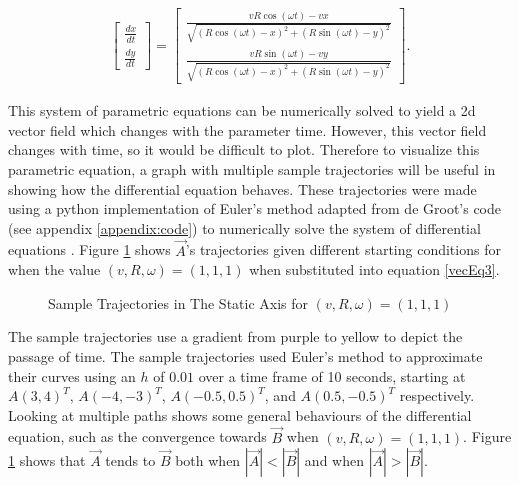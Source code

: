 \documentclass[pstricks, border=12pt]{article}
\begin{document}
\begin{equation}
    \begin{split}
    \begin{bmatrix}
        \frac{dx}{dt}\\
        \frac{dy}{dt}
    \end{bmatrix}
    = 
    \begin{bmatrix}
        \frac{vR\cos(\omega t) - vx}{\sqrt{(R\cos(\omega t) - x)^2 + (R\sin(\omega t) - y)^2}}\\
        \frac{vR\sin(\omega t) - vy}{\sqrt{(R\cos(\omega t) - x)^2 + (R\sin(\omega t) - y)^2}}
    \end{bmatrix}.
    \end{split}
    \label{vecEq3}
\end{equation}

This system of parametric equations can be numerically solved to yield a 2d vector field which changes with the parameter time. However, this vector field changes with time, so it would be difficult to plot. Therefore to visualize this parametric equation, a graph with multiple sample trajectories will be useful in showing how the differential equation behaves. These trajectories were made using a python implementation of Euler's method adapted from de Groot's code (see appendix \ref{appendix:code}) to numerically solve the system of differential equations \cite{ABELL2018277, degroot_2020}. Figure \ref{fig:inert vec feild} shows $\Vec{A}$'s trajectories given different starting conditions for when the value $(v, R, \omega) = (1, 1, 1)$ when substituted into equation \eqref{vecEq3}.

\begin{figure}[tbh]
    \centering
    
    \caption{Sample Trajectories in The Static Axis for $(v, R, \omega) = (1, 1, 1)$}
    \label{fig:inert vec feild}
\end{figure}

The sample trajectories use a gradient from purple to yellow to depict the passage of time. The sample trajectories used Euler's method to approximate their curves using an $h$ of $0.01$ over a time frame of 10 seconds, starting at $A(3, 4)^T$, $A(-4, -3)^T$, $A(-0.5, 0.5)^T$, and $A(0.5, -0.5)^T$ respectively. Looking at multiple paths shows some general behaviours of the differential equation, such as the convergence towards $\vec B$ when $(v, R, \omega) = (1, 1, 1)$. Figure \ref{fig:inert vec feild} shows that $\vec A$ tends to $\vec B$ both when $\left|\vec A\right| < \left|\vec B\right|$ and when $\left|\vec A\right| > \left|\vec B\right|$.
\end{document}
